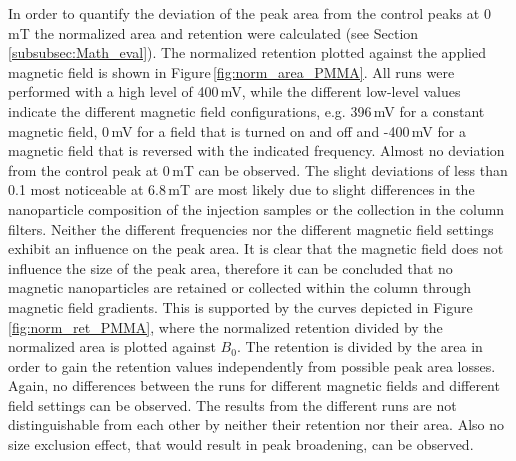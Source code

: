 In order to quantify the deviation of the peak area from the control peaks at 0\,mT the normalized area and retention were calculated (see Section\,\ref{subsubsec:Math_eval}). The normalized retention plotted against the applied magnetic field is shown in Figure\,\ref{fig:norm_area_PMMA}. All runs were performed with a high level of 400\,mV, while the different low-level values indicate the different magnetic field configurations, e.g. 396\,mV for a constant magnetic field, 0\,mV for a field that is turned on and off and -400\,mV for a magnetic field that is reversed with the indicated frequency. Almost no deviation from the control peak at 0\,mT can be observed. The slight deviations of less than 0.1 most noticeable at 6.8\,mT are most likely due to slight differences in the nanoparticle composition of the injection samples or the collection in the column filters. Neither the different frequencies nor the different magnetic field settings exhibit an influence on the peak area. It is clear that the magnetic field does not influence the size of the peak area, therefore it can be concluded that no magnetic nanoparticles are retained or collected within the column through magnetic field gradients. This is supported by the curves depicted in Figure\,\ref{fig:norm_ret_PMMA}, where the normalized retention divided by the normalized area is plotted against $B_{0}$. The retention is divided by the area in order to gain the retention values independently from possible peak area losses. Again, no differences between the runs for different magnetic fields and different field settings can be observed. The results from the different runs are not distinguishable from each other by neither their retention nor their area. Also no size exclusion effect, that would result in peak broadening, can be observed.
\newpage
